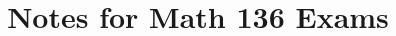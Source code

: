 \documentclass[8pt, landscape]{amsart}
\title{Notes for Math 136 Exams}
\theoremstyle{plain}
\newcommand{\1}{\mathbf{1}}
\begin{document}
 
\begin{multicols}{3}






\end{multicols}
\end{document}
